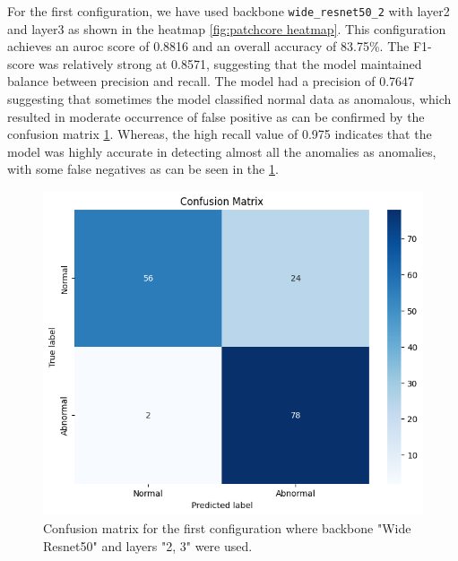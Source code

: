 For the first configuration, we have used backbone \texttt{wide\_resnet50\_2} with layer2 and layer3 as shown in the heatmap \ref{fig:patchcore heatmap}. This configuration achieves an \gls{auroc} score of 0.8816 and an overall accuracy of 83.75\%. The F1-score was relatively strong at 0.8571, suggesting that the model maintained balance between precision and recall. The model had a precision of 0.7647 suggesting that sometimes the model classified normal data as anomalous, which resulted in moderate occurrence of false positive as can be confirmed by the confusion matrix \ref{fig:patchcore config1 confusion matrix}. Whereas, the high recall value of 0.975 indicates that the model was highly accurate in detecting almost all the anomalies as anomalies, with some false negatives as can be seen in the \ref{fig:patchcore config1 confusion matrix}.

\begin{figure}[ht!]
    \centering
    \includegraphics[width=1\linewidth]{Rohit_Master_Thesis//Images/patchcore_config1_confusion_matrix.jpg}
    \caption{Confusion matrix for the first configuration where backbone "Wide Resnet50" and layers "2, 3" were used.}
    \label{fig:patchcore config1 confusion matrix}
\end{figure}

